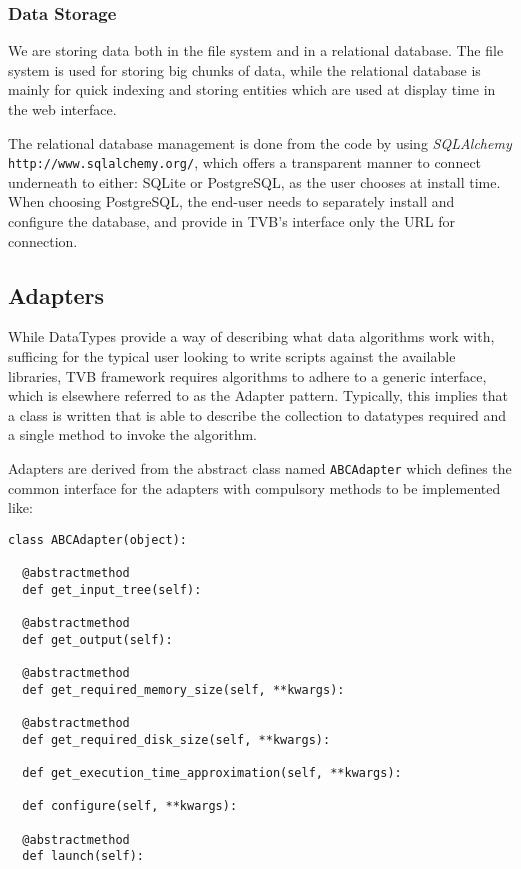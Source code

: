 
\subsubsection{Data Storage}

We are storing data both in the file system and in a relational database.
The file system is used for storing big chunks of data, while the relational 
database is mainly for quick indexing and storing entities which are used at 
display time in the web interface.

The relational database management is done from the code by using \emph{SQLAlchemy} \texttt{http://www.sqlalchemy.org/}, 
which offers a transparent manner to connect underneath to either: SQLite or PostgreSQL, as the user chooses at install time.
When choosing PostgreSQL, the end-user needs to separately install and configure the database, and provide in TVB's
interface only the URL for connection.


\subsection{Adapters}

While DataTypes provide a way of describing what data algorithms work with, 
sufficing for the typical user looking to write scripts against the
available libraries, TVB framework requires algorithms to adhere to 
a generic interface, which is elsewhere referred to as the Adapter pattern.
Typically, this implies that a class is written that is able to describe
the collection to datatypes required and a single method to invoke the
algorithm.

Adapters are derived from the abstract class named \texttt{ABCAdapter} which
defines the common interface for the adapters with compulsory methods to be implemented like:

\begin{lstlisting}[caption={The ABCAdapter listing},
                   label={lst:ABCAdapter}]
class ABCAdapter(object):

  @abstractmethod
  def get_input_tree(self):

  @abstractmethod
  def get_output(self):

  @abstractmethod
  def get_required_memory_size(self, **kwargs):

  @abstractmethod
  def get_required_disk_size(self, **kwargs):

  def get_execution_time_approximation(self, **kwargs):

  def configure(self, **kwargs):

  @abstractmethod
  def launch(self):
\end{lstlisting}

